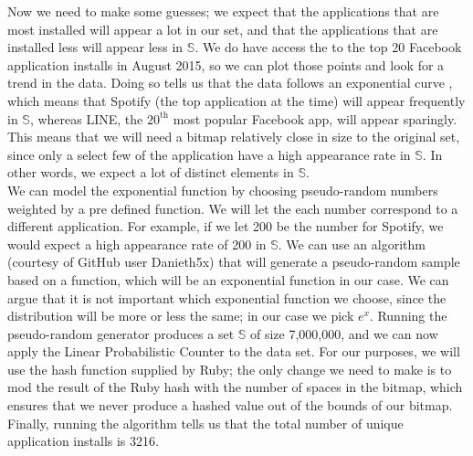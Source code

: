 \documentclass{article}
\begin{document}
Now we need to make some guesses; we expect that the applications that are most installed will appear a lot in our set, and that the applications that are installed less will appear less in $\mathbb{S}$. 
We do have access the to the top 20 Facebook application installs in August 2015, so we can plot those points and look for a trend in the data.
Doing so tells us that the data follows an exponential curve \cite{Facebook-2}, which means that Spotify (the top application at the time) will appear frequently in $\mathbb{S}$, whereas LINE, the $20^{\text{th}}$ most popular Facebook app, will appear sparingly.
This means that we will need a bitmap relatively close in size to the original set, since only a select few of the application have a high appearance rate in $\mathbb{S}$.
In other words, we expect a lot of distinct elements in $\mathbb{S}$.\\
\indent We can model the exponential function by choosing pseudo-random numbers weighted by a pre defined function.
We will let the each number correspond to a different application.
For example, if we let 200 be the number for Spotify, we would expect a high appearance rate of 200 in $\mathbb{S}$.
We can use an algorithm (courtesy of GitHub user Danieth5x) that will generate a pseudo-random sample based on a function, which will be an exponential function in our case.
We can argue that it is not important which exponential function we choose, since the distribution will be more or less the same; in our case we pick $e^{x}$.
Running the pseudo-random generator produces a set $\mathbb{S}$ of size 7,000,000, and we can now apply the Linear Probabilistic Counter to the data set.
For our purposes, we will use the hash function supplied by Ruby; the only change we need to make is to mod the result of the Ruby hash with the number of spaces in the bitmap, which ensures that we never produce a  hashed value out of the bounds of our bitmap.
Finally, running the algorithm tells us that the total number of unique application installs is 3216.\\
\end{document}
